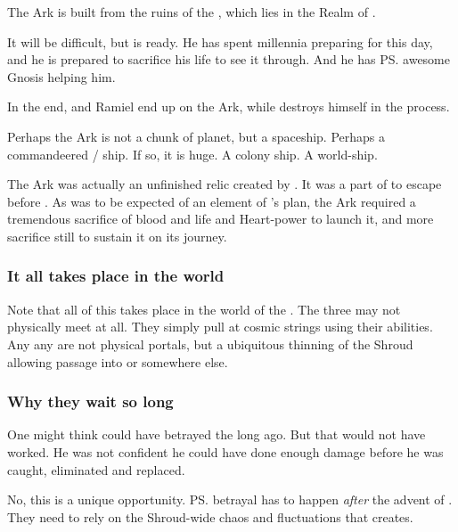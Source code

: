 The Ark is built from the ruins of the , which lies in the Realm of . 

It will be difficult, but \Azraid{} is ready. 
He has spent millennia preparing for this day, and he is prepared to sacrifice his life to see it through. 
And he has \ps{\Ishnaruchaefir} awesome Gnosis helping him. 

In the end, \Ishnaruchaefir{} and Ramiel end up on the Ark, while \Azraid{} destroys himself in the process. 

Perhaps the Ark is not a chunk of planet, but a spaceship. 
Perhaps a commandeered \bane/\resphan{} ship. 
If so, it is huge. 
A colony ship. 
A world-ship. 

The Ark was actually an unfinished relic created by \Sethicus. 
It was a part of  to escape \Miith before . 
As was to be expected of an element of \Sethicus's plan, the Ark required a tremendous sacrifice of blood and life and Heart-power to launch it, and more sacrifice still to sustain it on its journey. 





\subsubsection{It all takes place in the \matrix{} world}
Note that all of this takes place in the world of the \matrices. 
The three may not physically meet at all. 
They simply pull at cosmic strings using their \vertex{} abilities. 
Any any  are not physical portals, but a ubiquitous thinning of the Shroud allowing passage into \Erebos{} or somewhere else. 





\subsubsection{Why they wait so long}
One might think \Azraid{} could have betrayed the \banes{} long ago. 
But that would not have worked. 
He was not confident he could have done enough damage before he was caught, eliminated and replaced. 

No, this is a unique opportunity. 
\ps{\Azraid} betrayal has to happen \emph{after} the advent of \Lithrim. 
They need to rely on the Shroud-wide chaos and fluctuations that \Lithrim{} creates.





